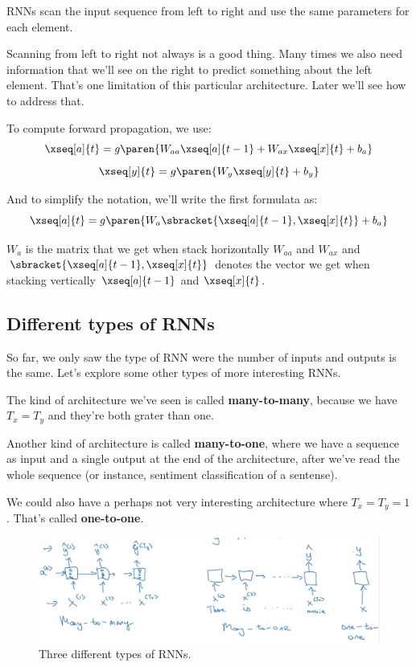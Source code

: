 \documentclass[12pt, a4paper, oneside]{book}
\begin{document}
RNNs scan the input sequence from left to right and use the same parameters
for each element.

Scanning from left to right not always is a good thing. Many times we also need
information that we'll see on the right to predict something about the left
element. That's one limitation of this particular architecture. Later we'll see
how to address that.

To compute forward propagation, we use:
\[
\xseq[a]{t}=g\paren{W_{aa}\xseq[a]{t-1}+W_{ax}\xseq[x]{t}+b_{a}}
\]
\[
\xseq[y]{t}=g\paren{W_{y}\xseq[y]{t}+b_{y}}
\]

And to simplify the notation, we'll write the first formulata as:
\[
\xseq[a]{t}=g\paren{W_{a}\sbracket{\xseq[a]{t-1}, \xseq[x]{t}}+b_{a}}
\]

$W_a$ is the matrix that we get when stack horizontally $W_{aa}$ and $W_{ax}$
and $\sbracket{\xseq[a]{t-1}, \xseq[x]{t}}$ denotes the vector we get when
stacking vertically $\xseq[a]{t-1}$ and $\xseq[x]{t}$.

\subsection{Different types of RNNs}%
\label{sub:different_types_of_rnns}

So far, we only saw the type of RNN were the number of inputs and outputs is the
same. Let's explore some other types of more interesting RNNs.

The kind of architecture we've seen is called \textbf{many-to-many}, because we
have $T_x=T_y$ and they're both grater than one.

Another kind of architecture is called \textbf{many-to-one}, where we have a
sequence as input and a single output at the end of the architecture, after
we've read the whole sequence (or instance, sentiment classification of a
sentense).

We could also have a perhaps not very interesting architecture where
$T_x=T_y=1$. That's called \textbf{one-to-one}.

\begin{figure}[h]
\centering
\includegraphics[scale=0.4]{Res/RNN-types.jpg}
\caption{Three different types of RNNs.}
\label{RNN-types.jpg}
\end{figure}
\end{document}
